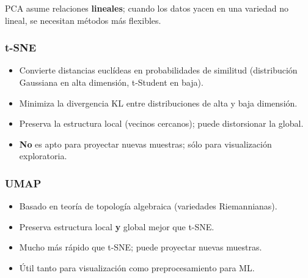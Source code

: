 \documentclass[12pt, a4paper]{article}
\begin{document}
PCA asume relaciones \textbf{lineales}; cuando los datos yacen en una variedad
no lineal, se necesitan métodos más flexibles.

\begin{figure}[H]
\centering
{}
\end{figure}

\subsubsection{t-SNE}
\begin{itemize}
  \item Convierte distancias euclídeas en probabilidades de similitud (distribución Gaussiana en alta dimensión, t-Student en baja).
  \item Minimiza la divergencia KL entre distribuciones de alta y baja dimensión.
  \item Preserva la estructura local (vecinos cercanos); puede distorsionar la global.
  \item \textbf{No} es apto para proyectar nuevas muestras; sólo para visualización exploratoria.
\end{itemize}

\subsubsection{UMAP}
\begin{itemize}
  \item Basado en teoría de topología algebraica (variedades Riemannianas).
  \item Preserva estructura local \textbf{y} global mejor que t-SNE.
  \item Mucho más rápido que t-SNE; puede proyectar nuevas muestras.
  \item Útil tanto para visualización como preprocesamiento para ML.
\end{itemize}
\end{document}
